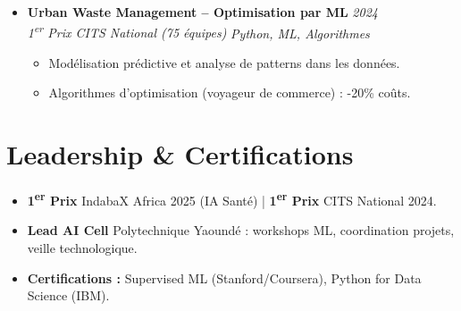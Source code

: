 \documentclass[a4paper,11pt]{article}
\begin{document}
\begin{itemize}[leftmargin=*, label={-}]
\item \textbf{Urban Waste Management -- Optimisation par ML} \hfill \textit{2024} \\
\textit{1\textsuperscript{er} Prix CITS National (75 équipes)} \hfill \textit{Python, ML, Algorithmes}
\vspace{-2pt}
    \begin{itemize}[leftmargin=0.4cm, nosep, label=\tiny$\bullet$]
        \item \small{Modélisation prédictive et analyse de patterns dans les données.}
        \item \small{Algorithmes d'optimisation (voyageur de commerce) : -20\% coûts.}
    \end{itemize}
\vspace{3pt}

\end{itemize}

\section{Leadership \& Certifications}
\begin{itemize}[leftmargin=*, label=\tiny$\bullet$, nosep]
    \item \small{\textbf{1\textsuperscript{er} Prix} IndabaX Africa 2025 (IA Santé) | \textbf{1\textsuperscript{er} Prix} CITS National 2024.}
    \item \small{\textbf{Lead AI Cell} Polytechnique Yaoundé : workshops ML, coordination projets, veille technologique.}
    \item \small{\textbf{Certifications :} Supervised ML (Stanford/Coursera), Python for Data Science (IBM).}
\end{itemize}
\end{document}
